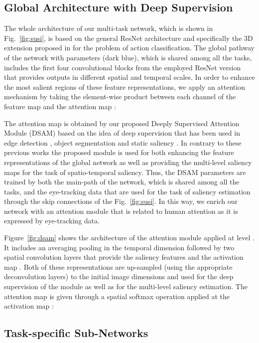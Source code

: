 \documentclass[10pt,twocolumn,letterpaper]{article}
\begin{document}
\subsection{Global Architecture with Deep Supervision}
The whole architecture of our multi-task network, which is shown in Fig.~\ref{fig:susi}, is based on the general ResNet architecture \cite{he2016deep} and specifically the 3D extension proposed in \cite{hara2018can} for the problem of action classification. The global pathway of the network with parameters  (dark blue), which is shared among all the tasks, includes the first four convolutional blocks  from the employed ResNet version that provides outputs  in different spatial and temporal scales. In order to enhance the most salient regions of these feature representations, we apply an attention mechanism by taking the element-wise product between each channel of the feature map  and the attention map :     

The attention map is obtained by our proposed Deeply Supervised Attention Module (DSAM) based on the idea of deep supervision that has been used in edge detection \cite{xie2015holistically}, object segmentation \cite{Cae+17} and static saliency \cite{wang2018deep}. In contrary to these previous works the proposed module is used for both enhancing the feature representations of the global network as well as providing the multi-level saliency maps for the task of spatio-temporal saliency. Thus, the DSAM parameters  are trained by both the main-path of the network, which is shared among all the tasks, and the eye-tracking data that are used for the task of saliency estimation through the skip connections of the Fig.~\ref{fig:susi}. In this way, we enrich our network with an attention module that is related to human attention as it is expressed by eye-tracking data.

Figure~\ref{fig:dsam} shows the architecture of the attention module applied at level . It includes an averaging pooling in the temporal dimension followed by two spatial convolution layers that provide the saliency features  and the activation map . Both of these representations are up-sampled (using the appropriate deconvolution layers) to the initial image dimensions and used for the deep supervision of the module as well as for the multi-level saliency estimation. The attention map  is given through a spatial softmax operation applied at the activation map :



\subsection{Task-specific Sub-Networks}
\end{document}
